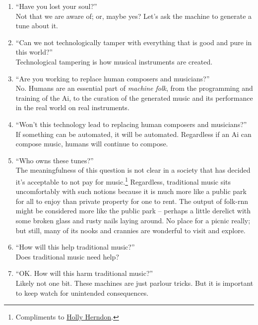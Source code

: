 \documentclass[a4paper,notitlepage,twoside]{book}
\begin{document}
\begin{enumerate}
\item ``Have you lost your soul?'' \\
Not that we are aware of; or, maybe yes?
Let's ask the machine to generate a tune about it.
\item ``Can we not technologically tamper with everything that is good and pure in this world?'' \\
Technological tampering is how musical instruments are created.
\item ``Are you working to replace human composers and musicians?'' \\
No. Humans are an essential part of {\em machine folk},
from the programming and training of the Ai, 
to the curation of the generated music and its performance in the real world
on real instruments.
\item ``Won't this technology lead to replacing human composers and musicians?'' \\
If something can be automated, it will be automated.
Regardless if an Ai can compose music,
humans will continue to compose.
\item ``Who owns these tunes?'' \\
The meaningfulness of this question is not clear in a society that has decided it's acceptable to not pay for music.\footnote{Compliments to \href{https://www.thefader.com/2020/02/25/holly-herndon-ai-generated-travis-scott-song-travisbott-jack-park-canny-dope-man-interview}{Holly Herndon}.}
Regardless, traditional music sits uncomfortably with such notions because it is much more like a public park for all to enjoy than private property for one to rent. The output of folk-rnn might be considered more like the public park – perhaps a little derelict with some broken glass and rusty nails laying around. No place for a picnic really; but still, many of its nooks and crannies are wonderful to visit and explore.
\item ``How will this help traditional music?''\\
Does traditional music need help?
\item ``OK. How will this harm traditional music?''\\
Likely not one bit. These machines are just parlour tricks.
But it is important to keep watch for unintended consequences.
\end{enumerate}
\end{document}

